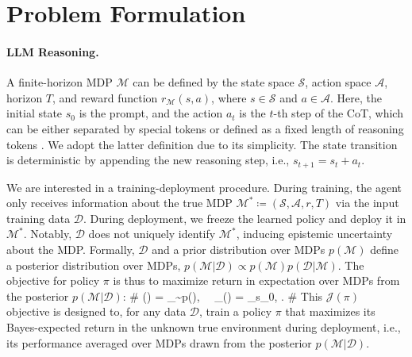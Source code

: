 \section{Problem Formulation}
\paragraph{LLM Reasoning.} A finite-horizon MDP $\mathcal{M}$ can be defined by the state space $\mathcal{S}$, action space $\mathcal{A}$, horizon $T$, and reward function $r_{\mathcal{M}}(s, a)$, where $s\in\mathcal{S}$ and $a\in\mathcal{A}$. Here, the initial state $s_0$ is the prompt, and the action $a_t$ is the $t$-th step of the CoT, which can be either separated by special tokens \citep{wang2023math} or defined as a fixed length of reasoning tokens \citep{luo2024improve}. We adopt the latter definition due to its simplicity. The state transition is deterministic by appending the new reasoning step, i.e., $s_{t+1} = s_t + a_t$.

We are interested in a training-deployment procedure. During training, the agent only receives information about the true MDP $\mathcal{M}^*\coloneqq (\mathcal{S}, \mathcal{A}, r, T)$ via the input training data $\mathcal{D}$. During deployment, we freeze the learned policy and deploy it in $\mathcal{M}^*$. Notably, $\mathcal{D}$ does not uniquely identify $\mathcal{M}^*$, inducing epistemic uncertainty about the MDP. Formally, $\mathcal{D}$ and a prior distribution over MDPs $p(\mathcal{M})$ define a posterior distribution over MDPs, $p(\mathcal{M}|\mathcal{D})\propto p(\mathcal{M})p(\mathcal{\mathcal{D}|\mathcal{M}})$. The objective for policy $\pi$ is thus to maximize return in expectation over MDPs from the posterior $p(\mathcal{M}|\mathcal{D})$:
\#\label{eq_org_obj}
(\pi) = \EE_{\sim p(\mid{})}, \,\,\,\,  _{}(\pi) = \EE_{s_0, \pi}\Biggl[\sum_{t=0}^{T-1} r_{\mathcal{M}}(s_t, a_t)\Biggr].
\#
This $\mathcal{J}(\pi)$ objective is designed to, for any data $\mathcal{D}$, train a policy $\pi$ that maximizes its Bayes-expected return in the unknown true environment during deployment, i.e., its performance averaged over MDPs drawn from the posterior $p(\mathcal{M}|\mathcal{D})$.
\vspace{-0.15cm}
